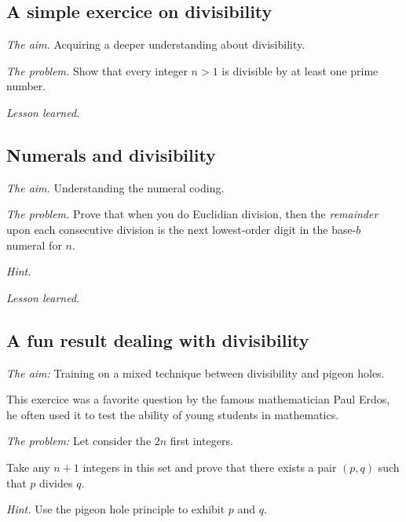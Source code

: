 \subsection{A simple exercice on divisibility}

\noindent \textit{The aim.}
Acquiring a deeper understanding about divisibility. 
\medskip

\noindent \textit{The problem.}
Show that every integer $n>1$ is divisible by at least one prime number.
\medskip

\noindent \textit{Lesson learned.}



\subsection{Numerals and divisibility}

\noindent \textit{The aim.}
Understanding the numeral coding.
\medskip

\noindent \textit{The problem.}
Prove that when you do Euclidian division, then the {\em remainder}
upon each consecutive division is the next lowest-order digit in the
base-$b$ numeral for $n$.
\medskip

\noindent \textit{Hint.}

\medskip

\noindent \textit{Lesson learned.}


\subsection{A fun result dealing with divisibility}

\noindent \textit{The aim:}
Training on a mixed technique between divisibility and pigeon holes.

This exercice was a favorite question by the famous mathematician Paul Erdos,
he often used it to test the ability of young students in mathematics.
\medskip

\noindent \textit{The problem:}
Let consider the $2n$ first integers.

Take any $n+1$ integers in this set and prove that there exists a pair $(p,q)$
such that $p$ divides $q$. 
\medskip


\noindent \textit{Hint.}
Use the pigeon hole principle to exhibit $p$ and $q$.
%
\medskip

